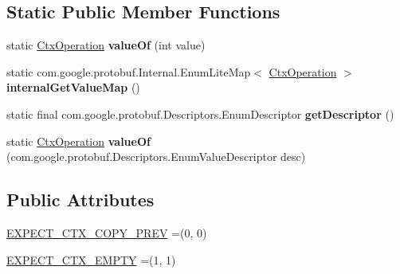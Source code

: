 \subsection*{Static Public Member Functions}
\begin{DoxyCompactItemize}
\item 
\mbox{\label{enumcom_1_1mysql_1_1cj_1_1x_1_1protobuf_1_1_mysqlx_expect_1_1_open_1_1_ctx_operation_a26176efbed837d025e7d890e38e655fc}} 
static \mbox{\hyperlink{enumcom_1_1mysql_1_1cj_1_1x_1_1protobuf_1_1_mysqlx_expect_1_1_open_1_1_ctx_operation}{Ctx\+Operation}} {\bfseries value\+Of} (int value)
\item 
\mbox{\label{enumcom_1_1mysql_1_1cj_1_1x_1_1protobuf_1_1_mysqlx_expect_1_1_open_1_1_ctx_operation_a59565389ad191c2e946ca9eb5f2d59cb}} 
static com.\+google.\+protobuf.\+Internal.\+Enum\+Lite\+Map$<$ \mbox{\hyperlink{enumcom_1_1mysql_1_1cj_1_1x_1_1protobuf_1_1_mysqlx_expect_1_1_open_1_1_ctx_operation}{Ctx\+Operation}} $>$ {\bfseries internal\+Get\+Value\+Map} ()
\item 
\mbox{\label{enumcom_1_1mysql_1_1cj_1_1x_1_1protobuf_1_1_mysqlx_expect_1_1_open_1_1_ctx_operation_a59f8f5e8a2f3c5fe5b6ca5ca43e5faf7}} 
static final com.\+google.\+protobuf.\+Descriptors.\+Enum\+Descriptor {\bfseries get\+Descriptor} ()
\item 
\mbox{\label{enumcom_1_1mysql_1_1cj_1_1x_1_1protobuf_1_1_mysqlx_expect_1_1_open_1_1_ctx_operation_a560a5034845ccf860f35ff5e51baeffa}} 
static \mbox{\hyperlink{enumcom_1_1mysql_1_1cj_1_1x_1_1protobuf_1_1_mysqlx_expect_1_1_open_1_1_ctx_operation}{Ctx\+Operation}} {\bfseries value\+Of} (com.\+google.\+protobuf.\+Descriptors.\+Enum\+Value\+Descriptor desc)
\end{DoxyCompactItemize}
\subsection*{Public Attributes}
\begin{DoxyCompactItemize}
\item 
\mbox{\hyperlink{enumcom_1_1mysql_1_1cj_1_1x_1_1protobuf_1_1_mysqlx_expect_1_1_open_1_1_ctx_operation_a7f58b438fc85b51f5026af47b95a9530}{E\+X\+P\+E\+C\+T\+\_\+\+C\+T\+X\+\_\+\+C\+O\+P\+Y\+\_\+\+P\+R\+EV}} =(0, 0)
\item 
\mbox{\hyperlink{enumcom_1_1mysql_1_1cj_1_1x_1_1protobuf_1_1_mysqlx_expect_1_1_open_1_1_ctx_operation_a2a53992a0efe3b4d491b01a93cb51ea4}{E\+X\+P\+E\+C\+T\+\_\+\+C\+T\+X\+\_\+\+E\+M\+P\+TY}} =(1, 1)
\end{DoxyCompactItemize}
